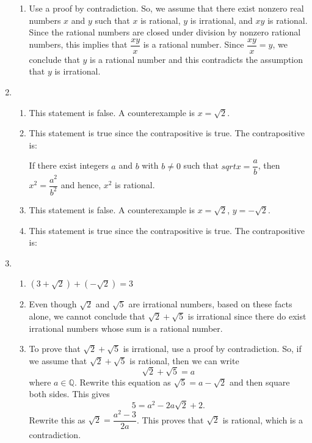 \begin{enumerate}
\begin{enumerate}
\item Use a proof by contradiction.  So, we assume that there exist nonzero real numbers $x$ and $y$ such that $x$ is rational, $y$ is irrational, and $xy$ is rational.  Since the rational numbers are closed under division by nonzero rational numbers, this implies that 
$\dfrac{xy}{x}$ is a rational number.  Since $\dfrac{xy}{x} = y$, we conclude that $y$ is a rational number and this contradicts the assumption that $y$ is irrational.
\end{enumerate}

\item
\begin{enumerate}
\item This statement is false.  A counterexample is $x = \sqrt{2}$.
\item This statement is true since the contrapositive is true.  The contrapositive is:
If there exist integers $a$ and $b$ with $b \ne 0$ such that $sqrt{x} = \dfrac{a}{b}$, then 
$x^2 = \dfrac{a^2}{b^2}$ and hence, $x^2$ is rational.

\item This statement is false.  A counterexample is $x = \sqrt{2}$, $y = -\sqrt{2}$.

\item This statement is true since the contrapositive is true.  The contrapositive is:
\end{enumerate}


\item \begin{enumerate}
\item $(3 + \sqrt{2}) + (-\sqrt{2}) = 3$

\item Even though $\sqrt{2}$ and $\sqrt{5}$ are irrational numbers, based on these facts alone, we cannot conclude that $\sqrt{2} + \sqrt{5}$ is irrational since there do exist irrational numbers whose sum is a rational number.

\item To prove that $\sqrt{2} + \sqrt{5}$ is irrational, use a proof by contradiction.  So, if we assume that $\sqrt{2} + \sqrt{5}$ is rational, then we can write
\[
\sqrt{2} + \sqrt{5} = a
\]
where $a \in \mathbb{Q}$.  Rewrite this equation as $\sqrt{5} = a - \sqrt{2}$ and then square both sides.  This gives
\[
5 = a^2 - 2a \sqrt{2} + 2.
\]
Rewrite this as $\sqrt{2} = \dfrac{a^2 - 3}{2a}$.  This proves that $\sqrt{2}$ is rational, which is a contradiction.
\end{enumerate}



\end{enumerate}
